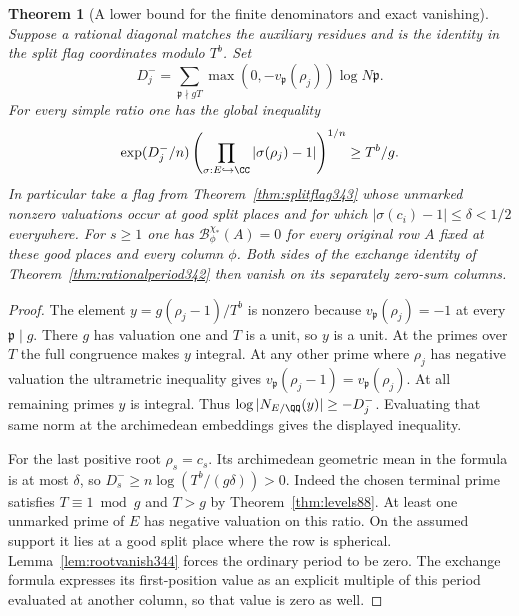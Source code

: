 \documentclass[a4paper,11pt]{article}
\newtheorem{theorem}[proposition]{Theorem}
\theoremstyle{definition}
\theoremstyle{remark}
\numberwithin{equation}{section}
\begin{document}
\begin{theorem}[A lower bound for the finite denominators and exact vanishing]\leavevmode\label{thm:flagvanish344}
Suppose a rational diagonal matches the auxiliary residues and is
the identity in the split flag coordinates modulo $T^b$. Set
\[
       D_j^-=\sum_{\mathfrak p\nmid gT}
                \max(0,-v_{\mathfrak p}(\rho_j))\log N\mathfrak p .
\]
For every simple ratio one has the global inequality
\[
     \exp(D_j^-/n)
         \left(\prod_{\sigma:E\hookrightarrow\CC}
                    |\sigma(\rho_j)-1|\right)^{1/n}\ge T^b/g .
\]
In particular take a flag from Theorem~\ref{thm:splitflag343}
whose unmarked nonzero valuations occur at good split places
and for which $|\sigma(c_i)-1|\le\delta<1/2$ everywhere.
For $s\ge1$ one has $\mathcal B^{\chi_*}_\phi(A)=0$ for every
original row $A$ fixed at these good places and every column $\phi$.
Both sides of the
exchange identity of Theorem~\ref{thm:rationalperiod342} then
vanish on its separately zero-sum columns.
\end{theorem}
\begin{proof}
The element $y=g(\rho_j-1)/T^b$ is nonzero because
$v_{\mathfrak p}(\rho_j)=-1$ at every $\mathfrak p\mid g$.
There $g$ has valuation one and $T$ is a unit, so $y$ is a unit.
At the primes over $T$ the full congruence makes $y$ integral.
At any other prime where $\rho_j$ has negative valuation the
ultrametric inequality gives
$v_{\mathfrak p}(\rho_j-1)=v_{\mathfrak p}(\rho_j)$.
At all remaining primes $y$ is integral. Thus
$\log|N_{E/\QQ}(y)|\ge-D_j^-$. Evaluating that same norm at
the archimedean embeddings gives the displayed inequality.

For the last positive root $\rho_s=c_s$. Its archimedean geometric
mean in the formula is at most $\delta$, so
$D_s^-\ge n\log(T^b/(g\delta))>0$. Indeed the chosen terminal
prime satisfies $T\equiv1\bmod g$ and $T>g$ by
Theorem~\ref{thm:levels88}. At least one unmarked prime of
$E$ has negative valuation on this ratio. On the assumed support
it lies at a good split place where the row is spherical.
Lemma~\ref{lem:rootvanish344} forces the ordinary period to be zero.
The exchange formula expresses its first-position value as an
explicit multiple of this period evaluated at another column, so
that value is zero as well.
\end{proof}
\end{document}
